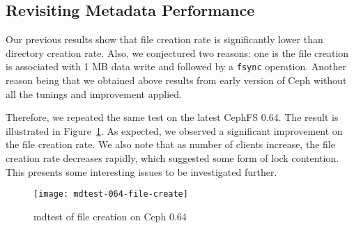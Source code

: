 \subsection{Revisiting Metadata Performance}

Our previous results show that file creation rate is significantly lower than
directory creation rate. Also, we conjectured two reasons: one is the file
creation is associated with 1 MB data write and followed by a \verb!fsync!
operation.  Another reason being that we obtained above results from early
version of Ceph without all the tunings and improvement applied. 

Therefore, we repeated the same test on the latest CephFS 0.64. The result is
illustrated in Figure~\ref{fig:mdtest-064-file-create}. As expected, we
observed a significant improvement on the file creation rate. We also note
that as number of clients increase, the file creation rate decreases rapidly,
which suggested some form of lock contention. This presents some interesting
issues to be investigated further.

\begin{figure}[htb]
\centering
\texttt{[image: mdtest-064-file-create]}
\caption{mdtest of file creation on Ceph 0.64}
\label{fig:mdtest-064-file-create}
\end{figure}

